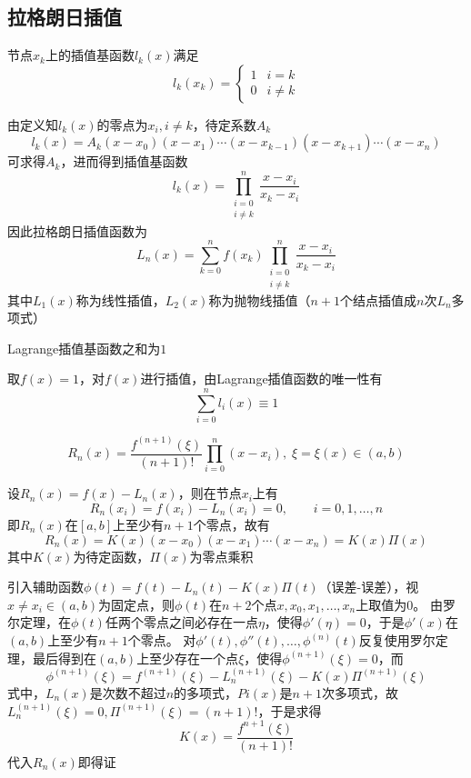 \subsection{拉格朗日插值}
\begin{definition}[拉格朗日插值基函数]
节点$x_k$上的插值基函数$l_k(x)$满足
\[l_k(x_k)=\begin{cases}1&i=k\\0&i\ne k\end{cases}\]
\end{definition}
\par 由定义知$l_k(x)$的零点为$x_i,i\ne k$，待定系数$A_k$
\[l_k(x)=A_k(x-x_0)(x-x_1)\cdots(x-x_{k-1})(x-x_{k+1})\cdots(x-x_n)\]
可求得$A_k$，进而得到插值基函数
\[l_k(x)=\prod_{\substack{i=0\\i\ne k}}^{n}\frac{x-x_i}{x_k-x_i}\]
因此拉格朗日插值函数为
\[L_n(x)=\sum_{k=0}^nf(x_k)\prod_{\substack{i=0\\i\ne k}}^{n}\frac{x-x_i}{x_k-x_i}\]
其中$L_1(x)$称为线性插值，$L_2(x)$称为抛物线插值（$n+1$个结点插值成$n$次$L_n$多项式）

\begin{theorem}
    Lagrange插值基函数之和为$1$
\end{theorem}
\begin{analysis}
    取$f(x)=1$，对$f(x)$进行插值，由Lagrange插值函数的唯一性有
    \[\sum_{i=0}^nl_i(x)\equiv 1\]
\end{analysis}

\begin{theorem}[Lagrange函数的误差估计]
\[R_n(x)=\frac{f^{(n+1)}(\xi)}{(n+1)!}\prod_{i=0}^n(x-x_i),\;\xi=\xi(x)\in(a,b)\]
\end{theorem}
\begin{analysis}
    设$R_n(x)=f(x)-L_n(x)$，则在节点$x_i$上有
    \[R_n(x_i)=f(x_i)-L_n(x_i)=0,\qquad i=0,1,\ldots,n\]
    即$R_n(x)$在$[a,b]$上至少有$n+1$个零点，故有
    \[R_n(x)=K(x)(x-x_0)(x-x_1)\cdots(x-x_n)=K(x)\Pi(x)\]
    其中$K(x)$为待定函数，$\Pi(x)$为零点乘积

    引入辅助函数$\phi(t)=f(t)-L_n(t)-K(x)\Pi(t)$（误差-误差），视$x\ne x_i\in(a,b)$为固定点，则$\phi(t)$在$n+2$个点$x,x_0,x_1,\ldots,x_n$上取值为$0$。
    由罗尔定理，在$\phi(t)$任两个零点之间必存在一点$\eta$，使得$\phi'(\eta)=0$，于是$\phi'(x)$在$(a,b)$上至少有$n+1$个零点。
    对$\phi'(t),\phi''(t),\ldots,\phi^{(n)}(t)$反复使用罗尔定理，最后得到在$(a,b)$上至少存在一个点$\xi$，使得$\phi^{(n+1)}(\xi)=0$，而
    \[\phi^{(n+1)}(\xi)=f^{(n+1)}(\xi)-L_n^{(n+1)}(\xi)-K(x)\Pi^{(n+1)}(\xi)\]
    式中，$L_n(x)$是次数不超过$n$的多项式，$Pi(x)$是$n+1$次多项式，故$L_n^{(n+1)}(\xi)=0,\Pi^{(n+1)}(\xi)=(n+1)!$，于是求得
    \[K(x)=\frac{f^{n+1}(\xi)}{(n+1)!}\]
    代入$R_n(x)$即得证
\end{analysis}

